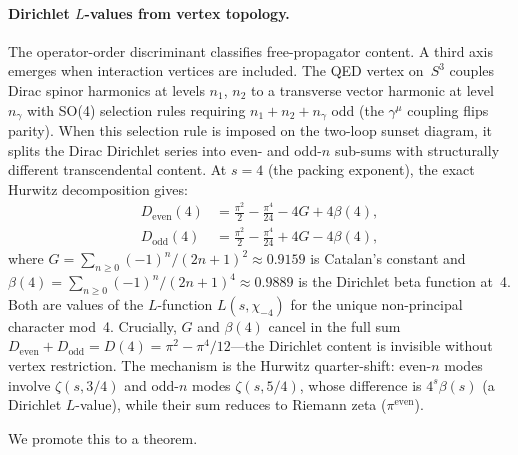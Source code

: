 \documentclass[aps,pra,twocolumn,superscriptaddress,longbibliography]{revtex4-2}
\begin{document}
\paragraph{Dirichlet $L$-values from vertex topology.}
The operator-order discriminant classifies free-propagator content.
A third axis emerges when interaction vertices are included.  The
QED vertex on~$S^3$ couples Dirac spinor harmonics at levels $n_1$,
$n_2$ to a transverse vector harmonic at level~$n_\gamma$ with
SO(4) selection rules requiring $n_1 + n_2 + n_\gamma$ odd (the
$\gamma^\mu$ coupling flips parity).  When this selection rule is
imposed on the two-loop sunset diagram, it splits the Dirac Dirichlet
series into even- and odd-$n$ sub-sums with structurally different
transcendental content.  At $s = 4$ (the packing exponent), the
exact Hurwitz decomposition gives:
\begin{align}
  D_{\text{even}}(4) &= \tfrac{\pi^2}{2} - \tfrac{\pi^4}{24}
    - 4G + 4\beta(4), \label{eq:d_even4} \\
  D_{\text{odd}}(4) &= \tfrac{\pi^2}{2} - \tfrac{\pi^4}{24}
    + 4G - 4\beta(4), \label{eq:d_odd4}
\end{align}
where $G = \sum_{n \ge 0} (-1)^n/(2n{+}1)^2 \approx 0.9159$ is
Catalan's constant and $\beta(4) = \sum_{n \ge 0} (-1)^n/(2n{+}1)^4
\approx 0.9889$ is the Dirichlet beta function at~4.  Both are values
of the $L$-function $L(s, \chi_{-4})$ for the unique non-principal
character mod~4.  Crucially, $G$ and $\beta(4)$ cancel in the full sum
$D_{\text{even}} + D_{\text{odd}} = D(4) = \pi^2 - \pi^4/12$---the
Dirichlet content is invisible without vertex restriction.  The
mechanism is the Hurwitz quarter-shift: even-$n$ modes involve
$\zeta(s, 3/4)$ and odd-$n$ modes $\zeta(s, 5/4)$, whose difference
is $4^s \beta(s)$ (a Dirichlet $L$-value), while their sum reduces
to Riemann zeta ($\pi^{\text{even}}$).

We promote this to a theorem.
\end{document}

